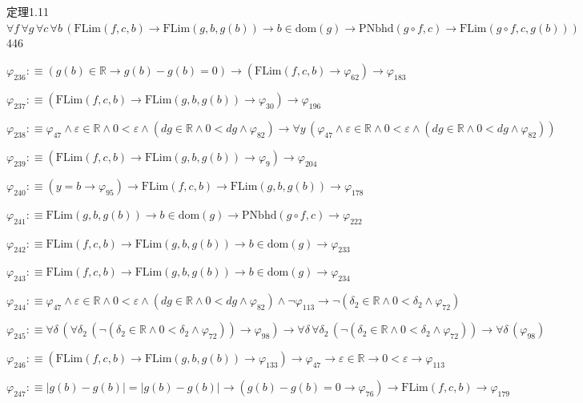 \begin{fullproof}{定理1.11}{$\forall f\,\forall g\,\forall c\,\forall b\,(\mathrm{FLim}(f,c,b) \to \mathrm{FLim}(g,b,g(b)) \to b \in \mathrm{dom}(g) \to \mathrm{PNbhd}(g \circ f,c) \to \mathrm{FLim}(g \circ f,c,g(b)))$}{446}
\begin{abbrevlist}
\item $\varphi_{236} :\equiv (g(b) \in \mathbb{R} \to g(b) - g(b) = 0) \to (\mathrm{FLim}(f,c,b) \to \varphi_{62}) \to \varphi_{183}$
\item $\varphi_{237} :\equiv (\mathrm{FLim}(f,c,b) \to \mathrm{FLim}(g,b,g(b)) \to \varphi_{30}) \to \varphi_{196}$
\item $\varphi_{238} :\equiv \varphi_{47} \land \varepsilon \in \mathbb{R} \land 0 < \varepsilon \land (\mathit{dg} \in \mathbb{R} \land 0 < \mathit{dg} \land \varphi_{82}) \to \forall y\,(\varphi_{47} \land \varepsilon \in \mathbb{R} \land 0 < \varepsilon \land (\mathit{dg} \in \mathbb{R} \land 0 < \mathit{dg} \land \varphi_{82}))$
\item $\varphi_{239} :\equiv (\mathrm{FLim}(f,c,b) \to \mathrm{FLim}(g,b,g(b)) \to \varphi_{9}) \to \varphi_{204}$
\item $\varphi_{240} :\equiv (y = b \to \varphi_{95}) \to \mathrm{FLim}(f,c,b) \to \mathrm{FLim}(g,b,g(b)) \to \varphi_{178}$
\item $\varphi_{241} :\equiv \mathrm{FLim}(g,b,g(b)) \to b \in \mathrm{dom}(g) \to \mathrm{PNbhd}(g \circ f,c) \to \varphi_{222}$
\item $\varphi_{242} :\equiv \mathrm{FLim}(f,c,b) \to \mathrm{FLim}(g,b,g(b)) \to b \in \mathrm{dom}(g) \to \varphi_{233}$
\item $\varphi_{243} :\equiv \mathrm{FLim}(f,c,b) \to \mathrm{FLim}(g,b,g(b)) \to b \in \mathrm{dom}(g) \to \varphi_{234}$
\item $\varphi_{244} :\equiv \varphi_{47} \land \varepsilon \in \mathbb{R} \land 0 < \varepsilon \land (\mathit{dg} \in \mathbb{R} \land 0 < \mathit{dg} \land \varphi_{82}) \land \neg \varphi_{113} \to \neg (\delta_{2} \in \mathbb{R} \land 0 < \delta_{2} \land \varphi_{72})$
\item $\varphi_{245} :\equiv \forall \delta\,(\forall \delta_{2}\,(\neg (\delta_{2} \in \mathbb{R} \land 0 < \delta_{2} \land \varphi_{72})) \to \varphi_{98}) \to \forall \delta\,\forall \delta_{2}\,(\neg (\delta_{2} \in \mathbb{R} \land 0 < \delta_{2} \land \varphi_{72})) \to \forall \delta\,(\varphi_{98})$
\item $\varphi_{246} :\equiv (\mathrm{FLim}(f,c,b) \to \mathrm{FLim}(g,b,g(b)) \to \varphi_{133}) \to \varphi_{47} \to \varepsilon \in \mathbb{R} \to 0 < \varepsilon \to \varphi_{113}$
\item $\varphi_{247} :\equiv \lvert g(b) - g(b) \rvert = \lvert g(b) - g(b) \rvert \to (g(b) - g(b) = 0 \to \varphi_{76}) \to \mathrm{FLim}(f,c,b) \to \varphi_{179}$

\end{abbrevlist}
\end{fullproof}
